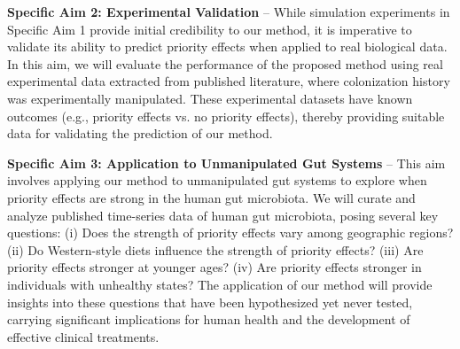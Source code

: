 \documentclass[12pt, class=article, crop=false]{standalone}
\begin{document}
\textbf{Specific Aim 2: Experimental Validation} --
While simulation experiments in Specific Aim 1 provide initial credibility to our method, it is imperative to validate its ability to predict priority effects when applied to real biological data.
In this aim, we will evaluate the performance of the proposed method using real experimental data extracted from published literature, where colonization history was experimentally manipulated.
These experimental datasets have known outcomes (e.g., priority effects vs. no priority effects), thereby providing suitable data for validating the prediction of our method.

\textbf{Specific Aim 3: Application to Unmanipulated Gut Systems} --
This aim involves applying our method to unmanipulated gut systems to explore when priority effects are strong in the human gut microbiota.
We will curate and analyze published time-series data of human gut microbiota, posing several key questions:
(i) Does the strength of priority effects vary among geographic regions?
(ii) Do Western-style diets influence the strength of priority effects?
(iii) Are priority effects stronger at younger ages?
(iv) Are priority effects stronger in individuals with unhealthy states?
The application of our method will provide insights into these questions that have been hypothesized yet never tested, carrying significant implications for human health and the development of effective clinical treatments.
\end{document}
